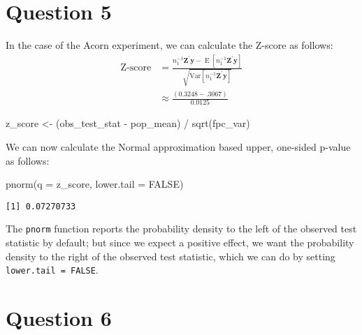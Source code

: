 \documentclass[
  12pt,
  leqno]{article}
\newenvironment{Shaded}{\begin{snugshade}}{\end{snugshade}}
\newcommand{\AttributeTok}[1]{\textcolor[rgb]{0.77,0.63,0.00}{#1}}
\newcommand{\ConstantTok}[1]{\textcolor[rgb]{0.00,0.00,0.00}{#1}}
\newcommand{\FunctionTok}[1]{\textcolor[rgb]{0.00,0.00,0.00}{#1}}
\newcommand{\NormalTok}[1]{#1}
\newcommand{\OtherTok}[1]{\textcolor[rgb]{0.56,0.35,0.01}{#1}}
\newcommand{\SpecialCharTok}[1]{\textcolor[rgb]{0.00,0.00,0.00}{#1}}
\DeclareMathOperator{\E}{\mathrm{E}}
\DeclareMathOperator{\1}{\mathbbm{1}}
\begin{document}
\section*{Question 5}

In the case of the Acorn experiment, we can calculate the Z-score as
follows: \begin{align*}
\text{Z-score} & = \frac{n_1^{-1}\mathbf{Z}^{\prime}\mathbf{y} - \E\left[n_1^{-1}\mathbf{Z}^{\prime}\mathbf{y}\right]}{\sqrt{\mathrm{Var}\left[n_1^{-1}\mathbf{Z}^{\prime}\mathbf{y}\right]}} \\
& \approx \frac{\left(0.3248 - .3067\right)}{0.0125}
\end{align*}

\scriptsize

\begin{Shaded}
\begin{Highlighting}[]
\NormalTok{z\_score }\OtherTok{\textless{}{-}}\NormalTok{ (obs\_test\_stat }\SpecialCharTok{{-}}\NormalTok{ pop\_mean) }\SpecialCharTok{/} \FunctionTok{sqrt}\NormalTok{(fpc\_var)}
\end{Highlighting}
\end{Shaded}

\normalsize

We can now calculate the Normal approximation based upper, one-sided
p-value as follows:

\scriptsize

\begin{Shaded}
\begin{Highlighting}[]
\FunctionTok{pnorm}\NormalTok{(}\AttributeTok{q =}\NormalTok{ z\_score,}
      \AttributeTok{lower.tail =} \ConstantTok{FALSE}\NormalTok{)}
\end{Highlighting}
\end{Shaded}

\begin{verbatim}
[1] 0.07270733
\end{verbatim}

\normalsize

The \texttt{pnorm} function reports the probability density to the left
of the observed test statistic by default; but since we expect a
positive effect, we want the probability density to the right of the
observed test statistic, which we can do by setting
\texttt{lower.tail = FALSE}.

\section*{Question 6}
\end{document}
